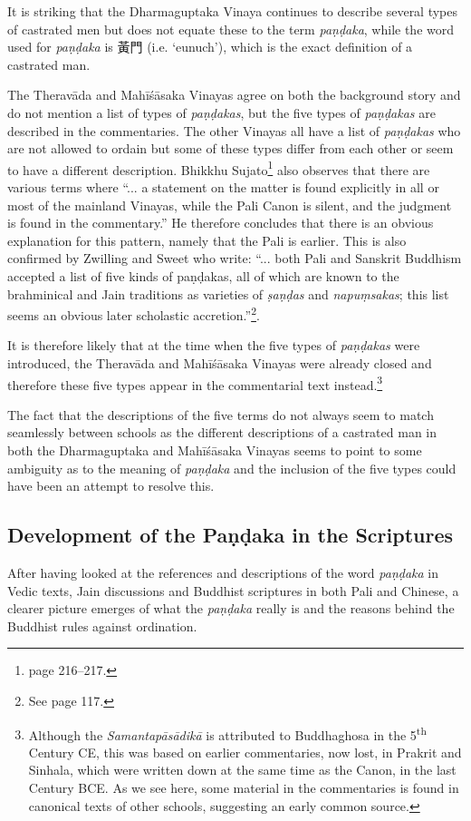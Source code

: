 It is striking that the Dharmaguptaka Vinaya continues to describe several types of castrated men but does not equate these to the term {\em paṇḍaka}, while the word used for {\em paṇḍaka} is 黃門 (i.e. `eunuch'), which is the exact definition of a castrated man.

The Theravāda and Mahīśāsaka Vinayas agree on both the background story and do not mention a list of types of {\em paṇḍakas}, but the five types of {\em paṇḍakas} are described in the commentaries. The other Vinayas all have a list of {\em paṇḍakas} who are not allowed to ordain but some of these types differ from each other or seem to have a different description. Bhikkhu Sujato\footnote{\cite{sujato2009} page 216–217.} also observes that there are various terms where ``... a statement on the matter is found explicitly in all or most of the mainland Vinayas, while the Pali Canon is silent, and the judgment is found in the commentary.'' He therefore concludes that there is an obvious explanation for this pattern, namely that the Pali is earlier. This is also confirmed by Zwilling and Sweet who write: ``... both Pali and Sanskrit Buddhism accepted a list of five kinds of paṇḍakas, all of which are known to the brahminical and Jain traditions as varieties of {\em ṣaṇḍas} and {\em napuṃsakas}; this list seems an obvious later scholastic accretion.''\footnote{See \cite{zwilling2000} page 117.}.

It is therefore likely that at the time when the five types of {\em paṇḍakas} were introduced, the Theravāda and Mahīśāsaka Vinayas were already closed and therefore these five types appear in the commentarial text instead.\footnote{Although the {\em Samantapāsādikā} is attributed to Buddhaghosa in the 5\textsuperscript{th} Century CE, this was based on earlier commentaries, now lost, in Prakrit and Sinhala, which were written down at the same time as the Canon, in the last Century BCE. As we see here, some material in the commentaries is found in canonical texts of other schools, suggesting an early common source.} 

The fact that the descriptions of the five terms do not always seem to match seamlessly between schools as the different descriptions of a castrated man in both the Dharmaguptaka and Mahīśāsaka Vinayas seems to point to some ambiguity as to the meaning of {\em paṇḍaka} and the inclusion of the five types could have been an attempt to resolve this.


\subsection{Development of the Paṇḍaka in the Scriptures}
After having looked at the references and descriptions of the word {\em paṇḍaka} in Vedic texts, Jain discussions and Buddhist scriptures in both Pali and Chinese, a clearer picture emerges of what the {\em paṇḍaka} really is and the reasons behind the Buddhist rules against ordination.

